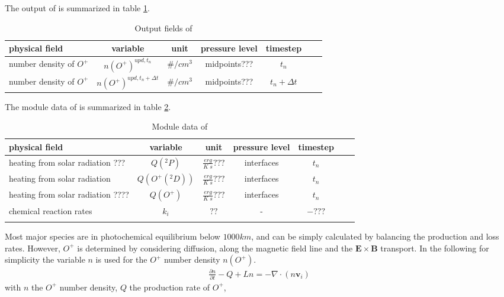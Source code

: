 %
The output of  is summarized in table
\ref{tab:output_oplus}.
%
\begin{table}[tb]
\begin{tabular}{|p{3.5cm} ||c|c|c|c|c|c|} \hline
physical field               & variable        & unit&pressure
level& timestep \\ \hline \hline
number density of $O^+$ &       $n(O^+)^{upd,t_n}$              & $\#/cm^3$   &  midpoints??? & $t_n$\\
number density of $O^+$ &       $n(O^+)^{upd,t_n+ \Delta t}$ &
$\#/cm^3$   &  midpoints??? & $t_n+ \Delta t$
\\ \hline \hline
\end{tabular}
\caption{Output fields of }
\label{tab:output_oplus}
\end{table}
%
%
The module data of  is summarized in table
\ref{tab:module_oplus}.
%
\begin{table}[tb]
\begin{tabular}{|p{3.5cm} ||c|c|c|c|c|c|} \hline
physical field               & variable        & unit&pressure
level& timestep \\ \hline \hline heating from solar radiation ???&
{$Q(^2P)$}     & $\frac{erg}{K \; s}???$   & interfaces  & $t_n$ \\
heating from solar radiation &
{$Q(O^+(^2D))$}     & $\frac{erg}{K \; s}???$   & interfaces  & $t_n$ \\
heating from solar radiation ????&
{$Q(O^+)$}     & $\frac{erg}{K \; s}???$   & interfaces  & $t_n$ \\
chemical reaction rates &
{$k_i$}     & $??$   & -  & $-???$ \\
\\ \hline \hline
\end{tabular}
\caption{Module data of }
\label{tab:module_oplus}
\end{table}
%
Most major species are in photochemical equilibrium below $1000 km$,
and can be simply calculated by balancing the production and loss
rates. However,  $O^+$ is determined by considering diffusion, along
the magnetic field line and the $\mathbf{E} \times \mathbf{B}$
transport. In the following for simplicity the variable $n$ is used
for the $O^+$ number density $n(O^+)$.
%
\begin{align}
  \frac{\partial n}{\partial t} -Q + L n = - \nabla \cdot (n
  \mathbf{v}_i) \label{eq:oplus_simple}
\end{align}
%
with $n$ the $O^+$ number density, $Q$ the production rate of $O^+$,
